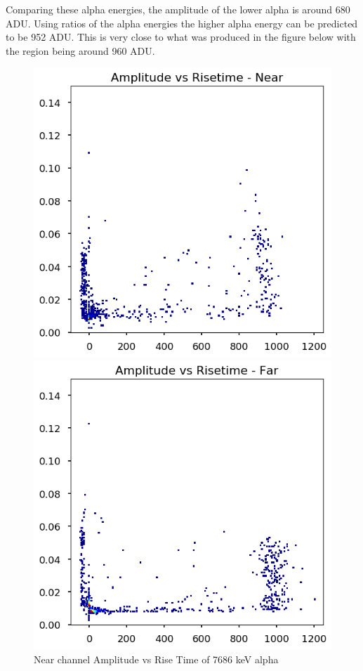 \documentclass[a4paper]{article}
\begin{document}
\noindent Comparing these alpha energies, the amplitude of the lower alpha is around 680 ADU. Using ratios of the alpha energies the higher alpha energy can be predicted to be 952 ADU. This is very close to what was produced in the figure below with the region being around 960 ADU.
\begin{figure}[H]
    \centering
    \begin{minipage}{.5\textwidth}
        \centering
        \includegraphics[width=1\linewidth]{Radon/steel_achinos-2d_South_alpha2.png}
        \caption{Near channel Amplitude vs Rise Time of 7686  keV alpha}
        \label{fig:prob1_6_2}
    \end{minipage}%
    \begin{minipage}{0.5\textwidth}
        \centering
        \includegraphics[width=1\linewidth]{Radon/steel_achinos-2d_North_alpha2.png}

\end{minipage}
\end{figure}
\end{document}
